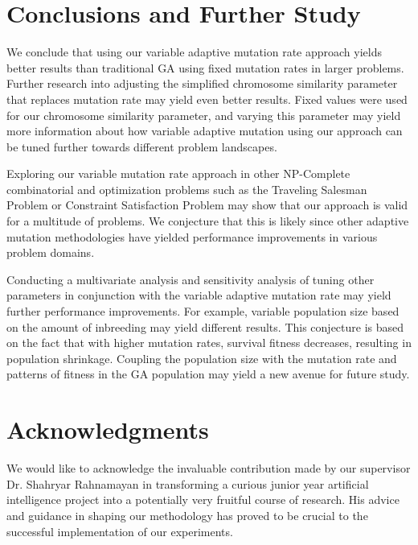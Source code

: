 \documentclass{sig-alternate}
\begin{document}
% 
%
\section{Conclusions and Further Study}
We conclude that using our variable adaptive mutation rate approach yields better results than traditional GA using fixed mutation rates in larger problems. Further research into adjusting the simplified chromosome similarity parameter that replaces mutation rate may yield even better results. Fixed values were used for our chromosome similarity parameter, and varying this parameter may yield more information about how variable adaptive mutation using our approach can be tuned further towards different problem landscapes.

Exploring our variable mutation rate approach in other NP-Complete combinatorial and optimization problems such as the Traveling Salesman Problem or Constraint Satisfaction Problem may show that our approach is valid for a multitude of problems. We conjecture that this is likely since other adaptive mutation methodologies have yielded performance improvements in various problem domains.

Conducting a multivariate analysis and sensitivity analysis of tuning other parameters in conjunction with the variable adaptive mutation rate may yield further performance improvements. For example, variable population size based on the amount of inbreeding may yield different results. This conjecture is based on the fact that with higher mutation rates, survival fitness decreases, resulting in population shrinkage. Coupling the population size with the mutation rate and patterns of fitness in the GA population may yield a new avenue for future study.

\begin{flushleft}\end{flushleft}

\section{Acknowledgments}
We would like to acknowledge the invaluable contribution made by our supervisor Dr. Shahryar Rahnamayan in transforming a curious junior year artificial intelligence project into a potentially very fruitful course of research. His advice and guidance in shaping our methodology has proved to be crucial to the successful implementation of our experiments.
\end{document}
